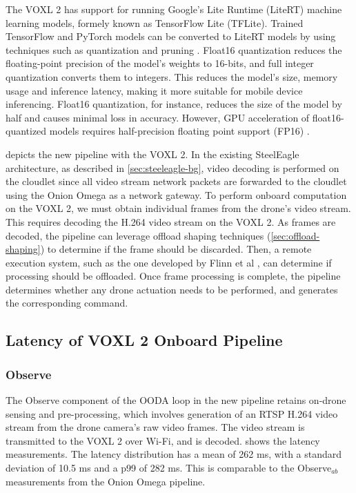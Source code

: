 The VOXL 2 has support for running Google's Lite Runtime (LiteRT) machine
learning models, formely known as TensorFlow Lite (TFLite). Trained TensorFlow
and PyTorch models can be converted to LiteRT models by using techniques such
as quantization and pruning \cite{jacob2017}. Float16 quantization reduces the
floating-point precision of the model's weights to 16-bits, and full integer
quantization converts them to integers. This reduces the model's size, memory
usage and inference latency, making it more suitable for mobile device
inferencing. Float16 quantization, for instance, reduces the size of the model
by half and causes minimal loss in accuracy. However, GPU acceleration of
float16-quantized models requires half-precision floating point support (FP16)
\cite{ho2017}.

 depicts the new pipeline with the VOXL 2.
In the existing SteelEagle architecture, as described in
\cref{sec:steeleagle-bg}, video decoding is performed on the cloudlet since all
video stream network packets are forwarded to the cloudlet using the Onion
Omega as a network gateway. To perform onboard computation on the VOXL 2, we
must obtain individual frames from the drone's video stream.  This requires
decoding the H.264 video stream on the VOXL 2. As frames are decoded, the
pipeline can leverage offload shaping techniques (\cref{sec:offload-shaping})
to determine if the frame should be discarded. Then, a remote execution system,
such as the one developed by Flinn et al \cite{flinn2002}, can determine if
processing should be offloaded. Once frame processing is complete, the pipeline
determines whether any drone actuation needs to be performed, and generates the
corresponding command.

\subsection{Latency of VOXL 2 Onboard Pipeline}

\subsubsection*{Observe}

The Observe component of the OODA loop in the new pipeline retains on-drone
sensing and pre-processing, which involves generation of an RTSP H.264 video
stream from the drone camera's raw video frames. The video stream is
transmitted to the VOXL 2 over Wi-Fi, and is decoded.
 shows the latency measurements. The
latency distribution has a mean of 262 ms, with a standard deviation of 10.5 ms
and a p99 of 282 ms. This is comparable to the Observe$_{ab}$ measurements from
the Onion Omega pipeline.

